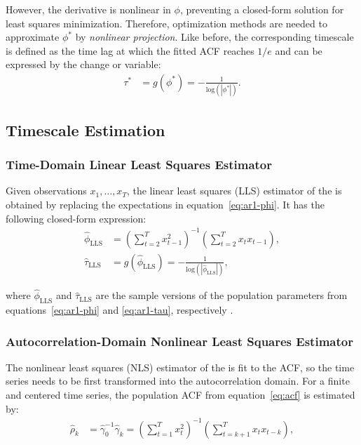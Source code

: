 \documentclass[docs/main.tex]{subfiles}
\begin{document}
\noindent However, the derivative is nonlinear in $\phi$, preventing a closed-form solution for least squares minimization. Therefore, optimization methods are needed to approximate $\phi^*$ by \textit{nonlinear projection}. Like before, the corresponding timescale is defined as the time lag at which the fitted ACF reaches $1/e$ and can be expressed by the change or variable:
\begin{align}
    \tau^* &= g(\phi^*) = -\frac{1}{\text{log}(|\phi^*|)}. \label{eq:nlm-tau}
\end{align}

\subsection{Timescale Estimation}\label{sec:timescale-estimation}
\subsubsection{Time-Domain Linear Least Squares Estimator}
Given observations $x_1, \ldots, x_T$, the linear least squares (LLS) estimator of the  is obtained by replacing the expectations in equation~\eqref{eq:ar1-phi}. It has the following closed-form expression:
\begin{align}
    \hat\phi_{\scriptscriptstyle\text{LLS}} &= \left(\sum_{t=2}^T x_{t-1}^2\right)^{-1} \left(\sum_{t=2}^T x_t x_{t-1}\right),\\
    \hat\tau_{\scriptscriptstyle\text{LLS}} &= g(\hat\phi_{\scriptscriptstyle\text{LLS}}) = -\frac{1}{\text{log}(|\hat\phi_{\scriptscriptstyle\text{LLS}}|)},
\end{align}

\noindent where $\hat\phi_{\scriptscriptstyle\text{LLS}}$ and $\hat\tau_{\scriptscriptstyle\text{LLS}}$ are the sample versions of the population parameters from equations~\eqref{eq:ar1-phi} and \eqref{eq:ar1-tau}, respectively \citep[Chapter~14.3]{hansen_econometrics_2022}.\\


\subsubsection{Autocorrelation-Domain Nonlinear Least Squares Estimator}
The nonlinear least squares (NLS) estimator of the  is fit to the ACF, so the time series needs to be first transformed into the autocorrelation domain. For a finite and centered time series, the population ACF from equation~\eqref{eq:acf} is estimated by:
\begin{align}\label{eq:acf_}
    \hat\rho_k &= \hat\gamma_0^{-1}\hat\gamma_k = \left(\sum_{t=1}^T x_t^2\right)^{-1} \left(\sum_{t=k+1}^{T}x_t x_{t-k}\right),
\end{align}
\end{document}
